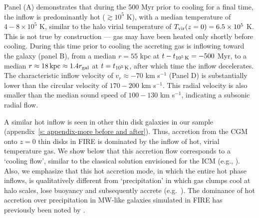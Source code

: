 \documentclass[fleqn,usenatbib]{mnras}
\newcommand{\tcools}{t_{10^5\,{\rm K}}}
\newcommand{\Tvir}{T_{\rm vir}}
\begin{document}
Panel (A) demonstrates that during the 500 Myr prior to cooling for a final time, the inflow is predominantly hot ($\gtrsim 10^5$ K), with a median temperature of $4-8\times10^5$ K, similar to the halo virial temperature of $\Tvir(z=0)=6.5\times10^5$ K.
This is not true by construction --- gas may have been heated only shortly before cooling.
During this time prior to cooling the accreting gas is inflowing toward the galaxy (panel B), from a median $r=55$ kpc at $t-\tcools=-500$ Myr, to a median $r\approx18\,{\rm kpc}\approx1.4 r_{\rm gal}$ at $t=\tcools$, after which time the inflow decelerates.
The characteristic inflow velocity of $v_r \approx-70$ km s$^{-1}$ (Panel D) is substantially lower than the circular velocity of $170-200$ km s$^{-1}$.
This radial velocity is also smaller than the median sound speed of $100-130$ km s$^{-1}$, indicating a subsonic radial flow. 


A similar hot inflow is seen in other thin disk galaxies in our sample (appendix~\ref{s: appendix-more before and after}).
Thus, accretion from the CGM onto $z=0$ thin disks in FIRE is dominated by the inflow of hot, virial temperature gas.
We show below that this accretion flow corresponds to a `cooling flow', similar to the classical solution envisioned for the ICM (e.g., \citealt{Mathews1978}).
Also, we emphasize that this hot accretion mode, in which the entire hot phase inflows, is qualitatively different from `precipitation' in which gas clumps cool at halo scales, lose buoyancy and subsequently accrete (e.g.~\citealt{Maller2004,Voit2017}). The dominance of hot accretion over precipitation in MW-like galaxies simulated in FIRE has previously been noted by \cite{Esmerian2021}. 
\end{document}
